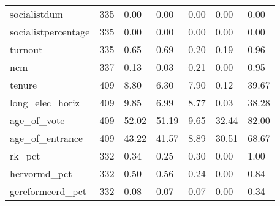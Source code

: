\begin{longtable}{lllllll}
socialistdum & 335 & 0.00 & 0.00 & 0.00 & 0.00 & 0.00 \\ 
socialistpercentage & 335 & 0.00 & 0.00 & 0.00 & 0.00 & 0.00 \\ 
turnout & 335 & 0.65 & 0.69 & 0.20 & 0.19 & 0.96 \\ 
ncm & 337 & 0.13 & 0.03 & 0.21 & 0.00 & 0.95 \\ 
tenure & 409 & 8.80 & 6.30 & 7.90 & 0.12 & 39.67 \\ 
long\_elec\_horiz & 409 & 9.85 & 6.99 & 8.77 & 0.03 & 38.28 \\ 
age\_of\_vote & 409 & 52.02 & 51.19 & 9.65 & 32.44 & 82.00 \\ 
age\_of\_entrance & 409 & 43.22 & 41.57 & 8.89 & 30.51 & 68.67 \\ 
rk\_pct & 332 & 0.34 & 0.25 & 0.30 & 0.00 & 1.00 \\ 
hervormd\_pct & 332 & 0.50 & 0.56 & 0.24 & 0.00 & 0.84 \\ 
gereformeerd\_pct & 332 & 0.08 & 0.07 & 0.07 & 0.00 & 0.34 \\ 
\bottomrule
\end{longtable}

